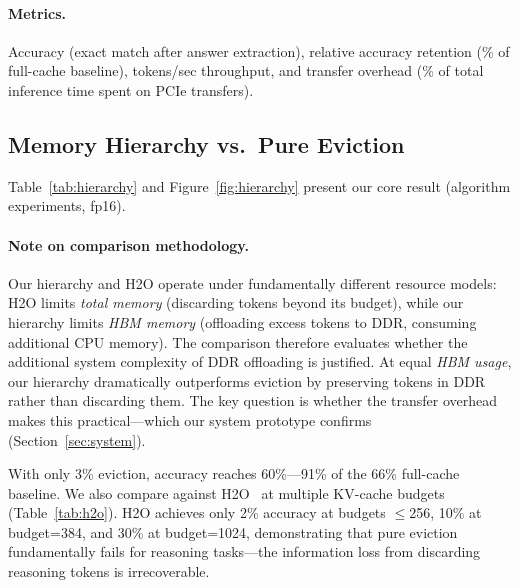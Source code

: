 \documentclass{article}
\begin{document}
\paragraph{Metrics.} Accuracy (exact match after answer extraction), relative accuracy retention (\% of full-cache baseline), tokens/sec throughput, and transfer overhead (\% of total inference time spent on PCIe transfers).

\subsection{Memory Hierarchy vs.\ Pure Eviction}
\label{sec:hierarchy_vs_eviction}

Table~\ref{tab:hierarchy} and Figure~\ref{fig:hierarchy} present our core result (algorithm experiments, fp16).

\paragraph{Note on comparison methodology.}
Our hierarchy and H2O operate under fundamentally different resource models: H2O limits \emph{total memory} (discarding tokens beyond its budget), while our hierarchy limits \emph{HBM memory} (offloading excess tokens to DDR, consuming additional CPU memory).
The comparison therefore evaluates whether the additional system complexity of DDR offloading is justified.
At equal \emph{HBM usage}, our hierarchy dramatically outperforms eviction by preserving tokens in DDR rather than discarding them.
The key question is whether the transfer overhead makes this practical---which our system prototype confirms (Section~\ref{sec:system}).

With only 3\% eviction, accuracy reaches 60\%---91\% of the 66\% full-cache baseline.
We also compare against H2O~\cite{h2o} at multiple KV-cache budgets (Table~\ref{tab:h2o}).
H2O achieves only 2\% accuracy at budgets $\leq$256, 10\% at budget=384, and 30\% at budget=1024, demonstrating that pure eviction fundamentally fails for reasoning tasks---the information loss from discarding reasoning tokens is irrecoverable.
\end{document}
